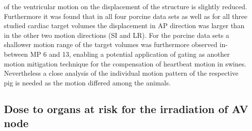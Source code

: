 of the ventricular motion on the displacement of the structure is slightly reduced. Furthermore it was found that in all four  
porcine data sets as well as for all three studied cardiac target volumes the displacement in AP direction was larger than in the other two 
motion directions (SI and LR). For the porcine data sets a shallower motion range of the target 
volumes was furthermore observed in-between MP 6 and 13, enabling a potential application of gating as another motion mitigation technique 
for the compensation of heartbeat motion in swines. Nevertheless a close analysis of the individual motion pattern of the respective pig 
is needed as the motion differed among the animals. 


\subsection{Dose to organs at risk for the irradiation of AV node}

